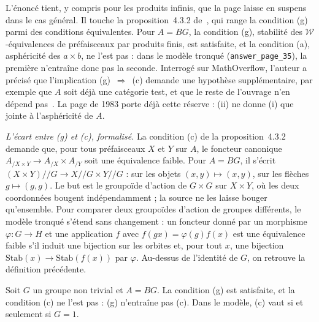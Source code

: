 \begin{remarque}
L'énoncé tient, y compris pour les produits infinis, que la page laisse en suspens dans le cas général. Il touche la proposition~4.3.2 de~\cite{cisinski2006}, qui range la condition (g) parmi des conditions équivalentes. Pour $A = BG$, la condition (g), stabilité des $\mathcal W$-équivalences de préfaisceaux par produits finis, est satisfaite, et la condition (a), asphéricité des $a \times b$, ne l'est pas : dans le modèle tronqué (\texttt{answer\_page\_35}), la première n'entraîne donc pas la seconde. Interrogé sur MathOverflow, l'auteur a précisé que l'implication (g)~$\Rightarrow$~(c) demande une hypothèse supplémentaire, par exemple que $A$ soit déjà une catégorie test, et que le reste de l'ouvrage n'en dépend pas~\cite{cisinskimo2026}. La page de 1983 porte déjà cette réserve : (ii) ne donne (i) que jointe à l'asphéricité de $A$.
\end{remarque}

\noindent\emph{L'écart entre (g) et (c), formalisé.} La condition (c) de la proposition~4.3.2 demande que, pour tous préfaisceaux $X$ et $Y$ sur $A$, le foncteur canonique $A_{/X \times Y} \to A_{/X} \times A_{/Y}$ soit une équivalence faible. Pour $A = BG$, il s'écrit $(X \times Y)/\!/G \to X/\!/G \times Y/\!/G$ : sur les objets $(x, y) \mapsto (x, y)$, sur les flèches $g \mapsto (g, g)$. Le but est le groupoïde d'action de $G \times G$ sur $X \times Y$, où les deux coordonnées bougent indépendamment ; la source ne les laisse bouger qu'ensemble. Pour comparer deux groupoïdes d'action de groupes différents, le modèle tronqué s'étend sans changement : un foncteur donné par un morphisme $\varphi : G \to H$ et une application $f$ avec $f(gx) = \varphi(g) f(x)$ est une équivalence faible s'il induit une bijection sur les orbites et, pour tout $x$, une bijection $\mathrm{Stab}(x) \to \mathrm{Stab}(f(x))$ par $\varphi$. Au-dessus de l'identité de $G$, on retrouve la définition précédente.

\begin{encadre}
\begin{contrexemple}
Soit $G$ un groupe non trivial et $A = BG$. La condition (g) est satisfaite, et la condition (c) ne l'est pas : (g) n'entraîne pas (c). Dans le modèle, (c) vaut si et seulement si $G = 1$.
\end{contrexemple}
\end{encadre}

